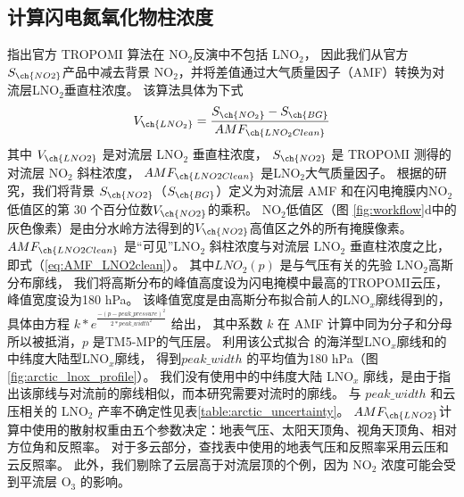 \subsection*{计算闪电氮氧化物柱浓度}

\citet{Zhang.2022a}指出官方 TROPOMI 算法在 NO$_2$反演中不包括 LNO$_2$，
因此我们从官方 $S_{\ch{NO2}}$产品中减去背景 NO$_2$，并将差值通过大气质量因子（AMF）转换为对流层LNO$_2$垂直柱浓度。
该算法具体为下式
\begin{equation} \label{eq:arctic_LNO2}
V_{\ch{LNO_2}} = \frac{S_{\ch{NO_2}} - S_{\ch{BG}}}{AMF_{\ch{LNO_2Clean}}}
\end{equation}
其中 $V_{\ch{LNO2}}$ 是对流层 LNO$_2$ 垂直柱浓度，
$S_{\ch{NO2}}$ 是 TROPOMI 测得的对流层 NO$_2$ 斜柱浓度，
$AMF_{\ch{LNO2Clean}}$ 是LNO$_2$大气质量因子。
根据\citet{Allen.2021a}的研究，我们将背景 $S_{\ch{NO2}}$（$S_{\ch{BG}}$）定义为对流层 AMF 和在闪电掩膜内NO$_2$低值区的第 30 个百分位数$V_{\ch{NO2}}$的乘积。
NO$_2$低值区（图 \ref{fig:workflow}d中的灰色像素）是由分水岭方法得到的$V_{\ch{NO2}}$高值区之外的所有掩膜像素。
$AMF_{\ch{LNO2Clean}}$ 是“可见”LNO$_2$ 斜柱浓度与对流层 LNO$_2$ 垂直柱浓度之比，即式（\ref{eq:AMF_LNO2clean}）。
其中$LNO_2(p)$ 是与气压有关的先验 LNO$_2$高斯分布廓线，
我们将高斯分布的峰值高度设为闪电掩模中最高的TROPOMI云压，峰值宽度设为180 hPa。
该峰值宽度是由高斯分布拟合前人的LNO$_x$廓线得到的，具体由方程 $k*e^\frac{{-{(p - peak\_pressure)}^2}}{2*peak\_width^{2}}$ 给出，
其中系数 $k$ 在 AMF 计算中同为分子和分母所以被抵消，$p$ 是TM5-MP的气压层。
利用该公式拟合 \citet{Ott.2010} 的海洋型LNO$_x$廓线和\citet{Luo.2017}的中纬度大陆型LNO$_x$廓线，
得到$peak\_width$ 的平均值为180 hPa（图\ref{fig:arctic_lnox_profile}）。
我们没有使用\citet{Ott.2010}中的中纬度大陆 LNO$_x$ 廓线，是由于\citet{Luo.2017}指出该廓线与对流前的廓线相似，而本研究需要对流时的廓线。
与 $peak\_width$ 和云压相关的 LNO$_2$ 产率不确定性见表\ref{table:arctic_uncertainty}。
$AMF_{\ch{LNO2}}$计算中使用的散射权重由五个参数决定：地表气压、太阳天顶角、视角天顶角、相对方位角和反照率。
对于多云部分，查找表中使用的地表气压和反照率采用云压和云反照率。
此外，我们剔除了云层高于对流层顶的个例，因为 NO$_2$ 浓度可能会受到平流层 O$_3$ 的影响\citep{Frey.2015a,Zhang.2022a}。


